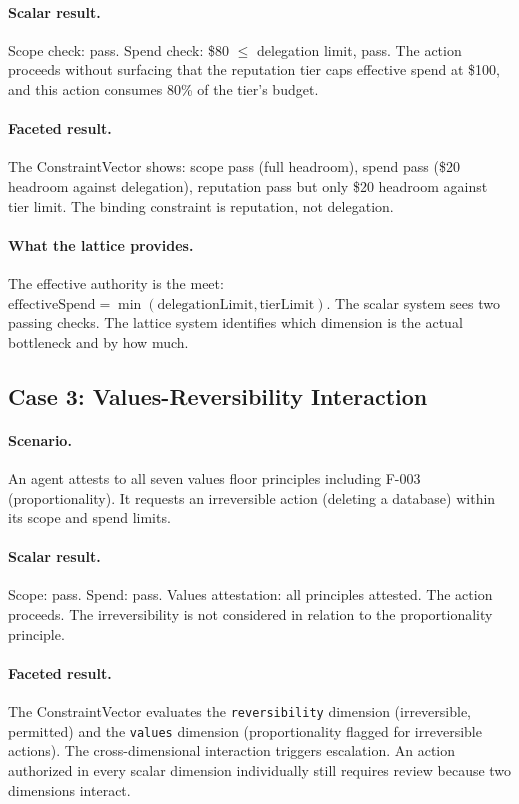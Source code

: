 \documentclass[sigconf,nonacm]{acmart}
\begin{document}
\paragraph{Scalar result.} Scope check: pass. Spend check: \$80 $\leq$ delegation limit,
pass. The action proceeds without surfacing that the reputation tier caps effective spend
at \$100, and this action consumes 80\% of the tier's budget.

\paragraph{Faceted result.} The ConstraintVector shows: scope pass (full headroom), spend
pass (\$20 headroom against delegation), reputation pass but only \$20 headroom against
tier limit. The binding constraint is reputation, not delegation.

\paragraph{What the lattice provides.} The effective authority is the meet:
$\text{effectiveSpend} = \min(\text{delegationLimit}, \text{tierLimit})$. The scalar
system sees two passing checks. The lattice system identifies which dimension is the
actual bottleneck and by how much.

\subsection{Case 3: Values-Reversibility Interaction}

\paragraph{Scenario.} An agent attests to all seven values floor principles including
F-003 (proportionality). It requests an irreversible action (deleting a database) within
its scope and spend limits.

\paragraph{Scalar result.} Scope: pass. Spend: pass. Values attestation: all principles
attested. The action proceeds. The irreversibility is not considered in relation to the
proportionality principle.

\paragraph{Faceted result.} The ConstraintVector evaluates the \texttt{reversibility}
dimension (irreversible, permitted) and the \texttt{values} dimension (proportionality
flagged for irreversible actions). The cross-dimensional interaction triggers escalation.
An action authorized in every scalar dimension individually still requires review because
two dimensions interact.
\end{document}
